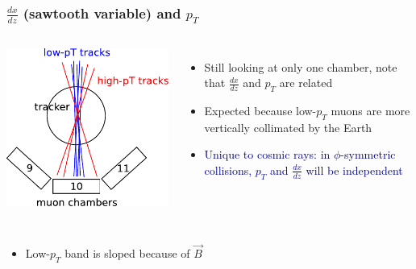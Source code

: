 \documentclass[compress]{beamer}
\begin{document}
\begin{frame}
\frametitle{$\frac{dx}{dz}$ (sawtooth variable) and $p_T$}

\begin{columns}
\vspace{0.25 cm}
\includegraphics[width=\linewidth]{cosmics_are_nasty.pdf}

\begin{itemize}
\item Still looking at only one chamber, note that $\frac{dx}{dz}$ and $p_T$ are related
\item Expected because low-$p_T$ muons are more vertically collimated by the Earth
\item \textcolor{darkblue}{Unique to cosmic rays: in $\phi$-symmetric collisions, $p_T$ and $\frac{dx}{dz}$ will be independent}
\end{itemize}
\end{columns}

\vspace{-0.25 cm}
\begin{columns}
\begin{itemize}
\item Low-$p_T$ band is sloped because of $\vec{B}$
\end{itemize}


\end{columns}
\end{frame}
\end{document}
